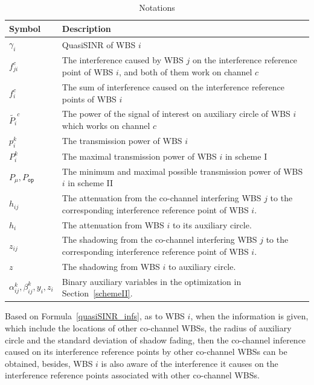 \documentclass[times]{ettauth}
\theoremstyle{mytheoremstyle}
\theoremstyle{mytheoremstyle}
\theoremstyle{mytheoremstyle}
\begin{document}
\begin{table}[h]
\caption{Notations}
\label{tab1}
\centering
\begin{tabular}{l p{6.5cm}}
\toprule
Symbol & Description \\
\midrule
$\gamma_i$ & QuasiSINR of WBS $i$\\
$f_{ji}^c$  & The interference caused by WBS $j$ on the interference reference point of WBS $i$, and both of them work on channel $c$\\
$f_i^c$ & The sum of interference caused on the interference reference points of WBS $i$ \\
$\tilde{P_i}^c$ & The power of the signal of interest on auxiliary circle of WBS $i$ which works on channel $c$     \\
$p_i^k$		& The transmission power of WBS $i$\\
$P_i^k$		& The maximal transmission power of WBS $i$ in scheme I\\
$P_\mu, P_{\mathtt{op}}$		& The minimum and maximal possible transmission power of WBS $i$ in scheme II\\
$h_{ij}$ & The attenuation from the co-channel interfering WBS $j$ to the corresponding interference reference point of WBS $i$.\\
$h_{i}$ & The attenuation from WBS $i$ to its auxiliary circle.\\
$z_{ij}$ & The shadowing from the co-channel interfering  WBS $j$ to the corresponding interference reference point of WBS $i$.\\
$z$ & The shadowing from WBS $i$ to auxiliary circle.\\
$\alpha_{ij}^k, \beta_{ij}^k, y_i, z_i$ & Binary auxiliary variables in the optimization in Section~\ref{schemeII}.\\
\bottomrule
\end{tabular}
\end{table}




Based on Formula~\ref{quasiSINR_infs}, as to WBS $i$, when the information is given, which include the locations of other co-channel WBSs, the radius of auxiliary circle and the standard deviation of shadow fading, then the co-channel inference caused on its interference reference points by other co-channel WBSs can be obtained, besides, WBS $i$ is also aware of the interference it causes on the interference reference points associated with other co-channel WBSs.
\end{document}
